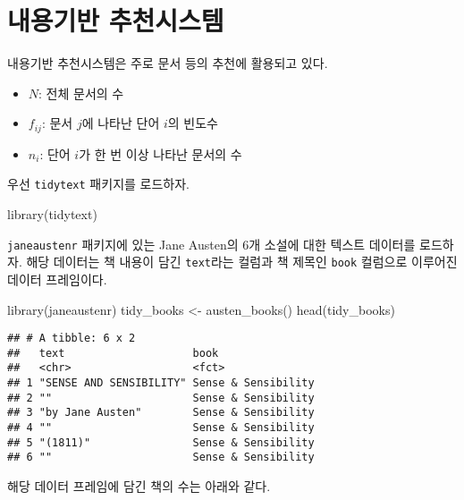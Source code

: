 \documentclass[
]{book}
\newenvironment{Shaded}{\begin{snugshade}}{\end{snugshade}}
\newcommand{\FunctionTok}[1]{\textcolor[rgb]{0.00,0.00,0.00}{#1}}
\newcommand{\NormalTok}[1]{#1}
\newcommand{\OtherTok}[1]{\textcolor[rgb]{0.56,0.35,0.01}{#1}}
\newcommand{\SpecialCharTok}[1]{\textcolor[rgb]{0.00,0.00,0.00}{#1}}
\providecommand{\tightlist}{%
  \setlength{\itemsep}{0pt}\setlength{\parskip}{0pt}}
\begin{document}
\hypertarget{content-based-recommender}{%
\section{내용기반 추천시스템}\label{content-based-recommender}}

내용기반 추천시스템은 주로 문서 등의 추천에 활용되고 있다.

\begin{itemize}
\tightlist
\item
  \(N\): 전체 문서의 수
\item
  \(f_{ij}\): 문서 \(j\)에 나타난 단어 \(i\)의 빈도수
\item
  \(n_i\): 단어 \(i\)가 한 번 이상 나타난 문서의 수
\end{itemize}

우선 \texttt{tidytext} 패키지를 로드하자.

\begin{Shaded}
\begin{Highlighting}[]
\FunctionTok{library}\NormalTok{(tidytext)}
\end{Highlighting}
\end{Shaded}

\texttt{janeaustenr} 패키지에 있는 Jane Austen의 6개 소설에 대한 텍스트 데이터를 로드하자. 해당 데이터는 책 내용이 담긴 \texttt{text}라는 컬럼과 책 제목인 \texttt{book} 컬럼으로 이루어진 데이터 프레임이다.

\begin{Shaded}
\begin{Highlighting}[]
\FunctionTok{library}\NormalTok{(janeaustenr)}
\NormalTok{tidy\_books }\OtherTok{\textless{}{-}} \FunctionTok{austen\_books}\NormalTok{()}
\FunctionTok{head}\NormalTok{(tidy\_books)}
\end{Highlighting}
\end{Shaded}

\begin{verbatim}
## # A tibble: 6 x 2
##   text                    book               
##   <chr>                   <fct>              
## 1 "SENSE AND SENSIBILITY" Sense & Sensibility
## 2 ""                      Sense & Sensibility
## 3 "by Jane Austen"        Sense & Sensibility
## 4 ""                      Sense & Sensibility
## 5 "(1811)"                Sense & Sensibility
## 6 ""                      Sense & Sensibility
\end{verbatim}

해당 데이터 프레임에 담긴 책의 수는 아래와 같다.

\begin{Shaded}
\end{Shaded}
\end{document}
